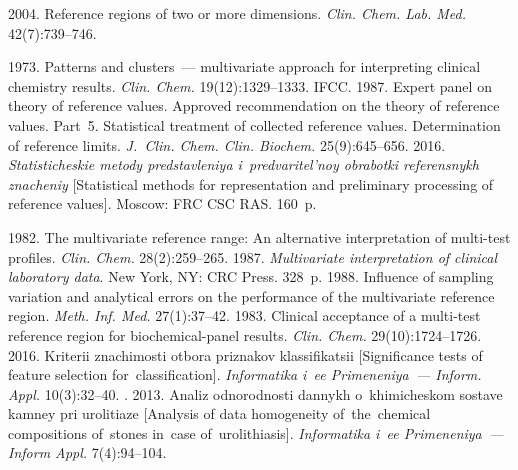 





  \begin{multicols}{2}

\renewcommand{\bibname}{\protect\rmfamily References}

{\small\frenchspacing
 {%
 \begin{thebibliography}{99}
 2004. Reference regions of two or more dimensions. \textit{Clin. 
Chem. Lab. Med.} 42(7):739--746.

 1973. Patterns and clusters~--- multivariate approach for interpreting 
clinical chemistry results. \textit{Clin. Chem.} 19(12):1329--1333.
IFCC. 1987. Expert panel on theory of reference values. Approved recommendation on the 
theory of reference values. Part~5. Statistical treatment of collected reference values. 
Determination of reference limits. \textit{J.~Clin. Chem. Clin. Biochem.} 
25(9):645--656.
 2016. \textit{Statisticheskie metody predstavleniya 
i~predvaritel'noy obrabotki referensnykh znacheniy}
[Statistical methods for representation and preliminary processing of
reference values]. Moscow: FRC CSC RAS. 160~p.

 1982. The multivariate reference range: An 
alternative interpretation of multi-test profiles. \textit{Clin. Chem.}  
28(2):259--265.
 1987. \textit{Multivariate interpretation of 
clinical laboratory data}. New York, NY: CRC Press. 328~p.
 1988. Influence of sampling variation and analytical errors on the 
performance of the multivariate reference region. \textit{Meth. Inf. Med.}  
27(1):37--42.
 1983. Clinical acceptance of a multi-test reference region 
for biochemical-panel results. \textit{Clin. Chem.} 29(10):1724--1726.
 2016. Kriterii znachimosti otbora priznakov klassifikatsii
[Significance tests of feature selection for~classification]. \textit{Informatika i~ee 
Primeneniya~--- Inform. Appl.} 10(3):32--40.
. 2013. Analiz 
odnorodnosti dannykh o~khimicheskom sostave kamney pri urolitiaze
[Analysis of data homogeneity of~the~chemical compositions 
of~stones in~case of~urolithiasis]. \textit{Informatika i~ee Primeneniya~---
Inform Appl.} 7(4):94--104.
\end{thebibliography}

 }
 }

\end{multicols}

